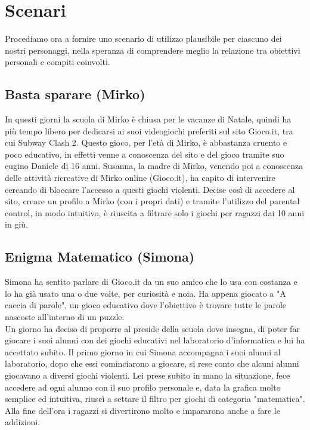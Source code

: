 \documentclass[../Report.tex]{subfiles}
\begin{document}
    \section{Scenari}
    Procediamo ora a fornire uno scenario di utilizzo plausibile per ciascuno dei nostri personaggi, nella speranza di comprendere meglio la relazione tra obiettivi personali e compiti coinvolti.

    \subsection{Basta sparare (Mirko)}
    In questi giorni la scuola di Mirko è chiusa per le vacanze di Natale, quindi ha più tempo libero per dedicarsi ai suoi videogiochi preferiti sul sito Gioco.it, tra cui Subway Clash 2. Questo gioco, per l'età di Mirko, è abbastanza cruento e poco educativo, in effetti venne a conoscenza del sito e del gioco tramite suo cugino Daniele di 16 anni. Susanna, la madre di Mirko, venendo poi a conoscenza delle attività ricreative di Mirko online (Gioco.it), ha capito di intervenire cercando di bloccare l'accesso a questi giochi violenti. Decise così di accedere al sito, creare un profilo a Mirko (con i propri dati) e tramite l'utilizzo del parental control, in modo intuitivo, è riuscita a filtrare solo i giochi per ragazzi dai 10 anni in giù.

    \subsection{Enigma Matematico (Simona)}
    Simona ha sentito parlare di Gioco.it da un suo amico che lo usa con costanza e lo ha già usato una o due volte, per curiosità e noia. Ha appena giocato a "A caccia di parole", un gioco educativo dove l'obiettivo è trovare tutte le parole nascoste all'interno di un puzzle.\\
    Un giorno ha deciso di proporre al preside della scuola dove insegna, di poter far giocare i suoi alunni con dei giochi educativi nel laboratorio d'informatica e lui ha accettato subito. Il primo giorno in cui Simona accompagna i suoi alunni al laboratorio, dopo che essi cominciarono a giocare, si rese conto che alcuni alunni giocavano a diversi giochi violenti. Lei prese subito in mano la situazione, fece accedere ad ogni alunno con il suo profilo personale e, data la grafica molto semplice ed intuitiva, riuscì a settare il filtro per giochi di categoria "matematica". Alla fine dell'ora i ragazzi si divertirono molto e impararono anche a fare le addizioni.
\end{document}
